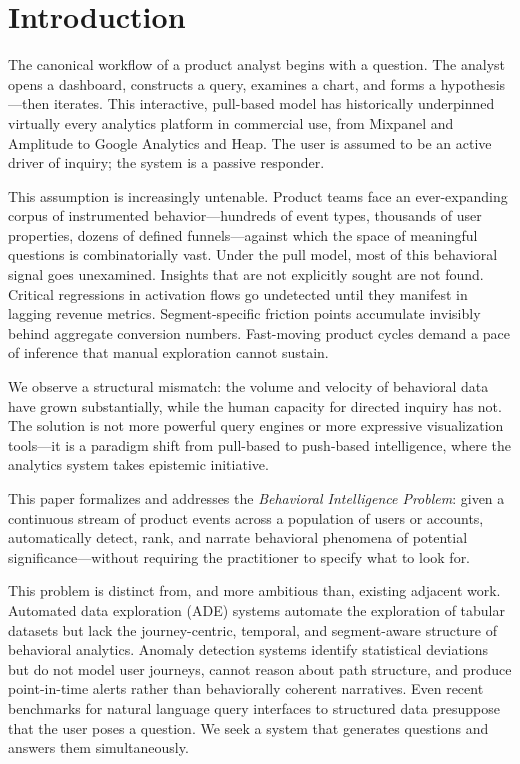 \documentclass[12pt, a4paper]{article}
\begin{document}
\tableofcontents
\newpage

\section{Introduction}

The canonical workflow of a product analyst begins with a question. The analyst opens a dashboard, constructs a query, examines a chart, and forms a hypothesis---then iterates. This interactive, pull-based model has historically underpinned virtually every analytics platform in commercial use, from Mixpanel and Amplitude to Google Analytics and Heap. The user is assumed to be an active driver of inquiry; the system is a passive responder.

This assumption is increasingly untenable. Product teams face an ever-expanding corpus of instrumented behavior---hundreds of event types, thousands of user properties, dozens of defined funnels---against which the space of meaningful questions is combinatorially vast. Under the pull model, most of this behavioral signal goes unexamined. Insights that are not explicitly sought are not found. Critical regressions in activation flows go undetected until they manifest in lagging revenue metrics. Segment-specific friction points accumulate invisibly behind aggregate conversion numbers. Fast-moving product cycles demand a pace of inference that manual exploration cannot sustain.

We observe a structural mismatch: the volume and velocity of behavioral data have grown substantially, while the human capacity for directed inquiry has not. The solution is not more powerful query engines or more expressive visualization tools---it is a paradigm shift from pull-based to push-based intelligence, where the analytics system takes epistemic initiative.

This paper formalizes and addresses the \textit{Behavioral Intelligence Problem}: given a continuous stream of product events across a population of users or accounts, automatically detect, rank, and narrate behavioral phenomena of potential significance---without requiring the practitioner to specify what to look for.

This problem is distinct from, and more ambitious than, existing adjacent work. Automated data exploration (ADE) systems \cite{law2020,ma2021} automate the exploration of tabular datasets but lack the journey-centric, temporal, and segment-aware structure of behavioral analytics. Anomaly detection systems identify statistical deviations but do not model user journeys, cannot reason about path structure, and produce point-in-time alerts rather than behaviorally coherent narratives. Even recent benchmarks for natural language query interfaces to structured data \cite{he2024} presuppose that the user poses a question. We seek a system that generates questions and answers them simultaneously.
\end{document}
